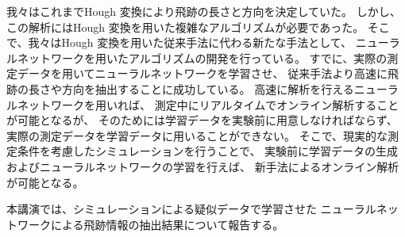 \documentclass[12pt,a4paper]{jsarticle}
\begin{document}
我々はこれまでHough 変換により飛跡の長さと方向を決定していた。
しかし、この解析にはHough 変換を用いた複雑なアルゴリズムが必要であった。
そこで、我々はHough 変換を用いた従来手法に代わる新たな手法として、
ニューラルネットワークを用いたアルゴリズムの開発を行っている。
すでに、実際の測定データを用いてニューラルネットワークを学習させ、
従来手法より高速に飛跡の長さや方向を抽出することに成功している。
高速に解析を行えるニューラルネットワークを用いれば、
測定中にリアルタイムでオンライン解析することが可能となるが、
そのためには学習データを実験前に用意しなければならず、
実際の測定データを学習データに用いることができない。
そこで、現実的な測定条件を考慮したシミュレーションを行うことで、
実験前に学習データの生成およびニューラルネットワークの学習を行えば、
新手法によるオンライン解析が可能となる。

本講演では、シミュレーションによる疑似データで学習させた
ニューラルネットワークによる飛跡情報の抽出結果について報告する。

\end{document}
